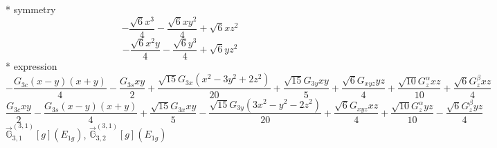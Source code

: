 \documentclass[fleqn,8pt]{jsarticle}
\begin{document}
\noindent\quad ** symmetry
\begin{dmath*}
- \frac{\sqrt{6} x^{3}}{4} - \frac{\sqrt{6} x y^{2}}{4} + \sqrt{6} x z^{2}
\end{dmath*}
\begin{dmath*}
- \frac{\sqrt{6} x^{2} y}{4} - \frac{\sqrt{6} y^{3}}{4} + \sqrt{6} y z^{2}
\end{dmath*}
\noindent\quad ** expression
\begin{dmath*}
- \frac{G_{3c} \left(x - y\right) \left(x + y\right)}{4} - \frac{G_{3s} x y}{2} + \frac{\sqrt{15} G_{3x} \left(x^{2} - 3 y^{2} + 2 z^{2}\right)}{20} + \frac{\sqrt{15} G_{3y} x y}{5} + \frac{\sqrt{6} G_{xyz} y z}{4} + \frac{\sqrt{10} G_{z}^{\alpha} x z}{10} + \frac{\sqrt{6} G_{z}^{\beta} x z}{4}
\end{dmath*}
\begin{dmath*}
\frac{G_{3c} x y}{2} - \frac{G_{3s} \left(x - y\right) \left(x + y\right)}{4} + \frac{\sqrt{15} G_{3x} x y}{5} - \frac{\sqrt{15} G_{3y} \left(3 x^{2} - y^{2} - 2 z^{2}\right)}{20} + \frac{\sqrt{6} G_{xyz} x z}{4} + \frac{\sqrt{10} G_{z}^{\alpha} y z}{10} - \frac{\sqrt{6} G_{z}^{\beta} y z}{4}
\end{dmath*}
\noindent\quad $\vec{\mathbb{G}}_{3,1}^{(3,1)}[g](E_{1g})$, $\vec{\mathbb{G}}_{3,2}^{(3,1)}[g](E_{1g})$
\end{document}
